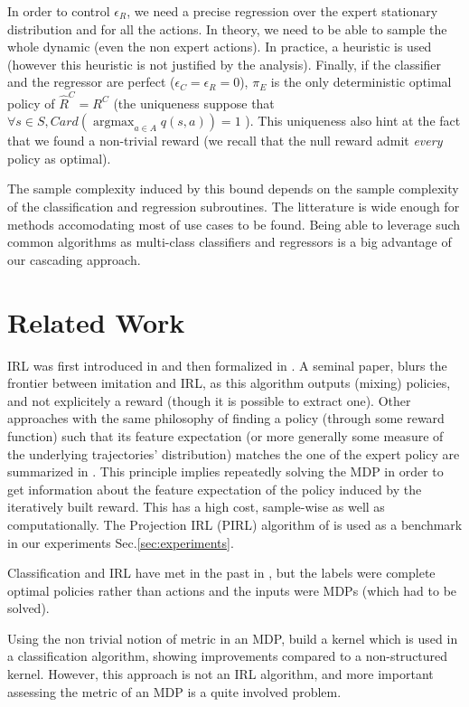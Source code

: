 \documentclass[11pt]{article}
\newcommand{\argmax}{\operatorname*{argmax}} %
\begin{document}
In order to control $\epsilon_R$, we need a precise regression over the expert stationary distribution and for all the actions. In theory, we need to be able to sample the whole dynamic (even the non expert actions). In practice, a heuristic is used (however this heuristic is not justified by the analysis).
Finally, if the classifier and the regressor are perfect ($\epsilon_C=\epsilon_R=0$), $\pi_E$ is the only deterministic optimal policy of $\hat{R}^C=R^C$ (the uniqueness suppose that $\forall s\in S, Card(\argmax_{a\in A}q(s,a))=1$ ). This uniqueness also hint at the fact that we found a non-trivial reward (we recall that the null reward admit \emph{every} policy as optimal).

The sample complexity induced by this bound depends on the sample complexity of the classification and regression subroutines. The litterature is wide enough for methods accomodating most of use cases to be found. Being able to leverage such common algorithms as multi-class classifiers and regressors is a big advantage of our cascading approach.

\section{Related Work}
\label{sec:related}
IRL was first introduced in \cite{russell1998learning} and then formalized in \cite{ng2000algorithms}. A seminal paper, \cite{abbeel2004apprenticeship} blurs the frontier between imitation and IRL, as this algorithm outputs (mixing) policies, and not explicitely a reward (though it is possible to extract one). Other approaches with the same philosophy of finding a policy
(through some reward function) such that its feature expectation (or
more generally some measure of the underlying trajectories'
distribution) matches the one of the expert policy are summarized in \cite{neu2009training}. This principle implies repeatedly solving the MDP in order to get information about the feature expectation of the policy induced by the iteratively built reward. This has a high cost, sample-wise as well as computationally. The Projection IRL (PIRL) algorithm of \cite{abbeel2004apprenticeship} is used as a benchmark in our experiments Sec.\ref{sec:experiments}.

Classification and IRL have met in the past in \cite{ratliff2006maximum}, but the labels were complete optimal policies rather than actions and the inputs were MDPs (which had to be solved).

Using the non trivial notion of metric in an MDP, \cite{melo2010learning} build a kernel which is used
in a classification algorithm, showing improvements compared to a
non-structured kernel. However, this approach is not an IRL
algorithm, and more important assessing the metric of an MDP is a
quite involved problem.
\end{document}
